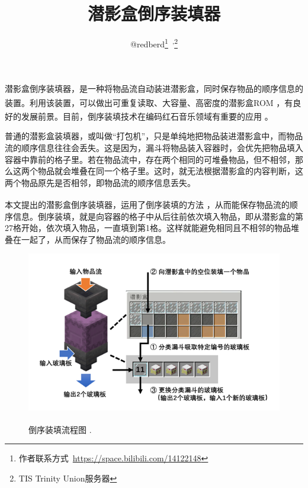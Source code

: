 \documentclass[UTF8,12pt,punct=kaiming,fontset=none]{ctexart}
\title{\vspace{-1.5cm}潜影盒倒序装填器\vspace{-0.5cm}}
\author{@redberd\thanks{作者联系方式~\url{https://space.bilibili.com/14122148}}~\textsuperscript{,}\thanks{TIS Trinity Union服务器}}
\date{}
\newcommand*{\upcite}[1]{
    \textsuperscript{\cite{#1}}
}
\begin{document}
\maketitle
\thispagestyle{fancy} %
\vspace{-0.7cm}

\titleformat{\section}[hang]{\large\sffamily\bfseries}{\textmd{\thesection}}{0.5cm}{}
\titlespacing{\section}{0cm}{0.5ex}{0.2ex}
\titleformat{\subsection}[hang]{\normalsize\sffamily}{\textmd{\thesubsection}}{0.5cm}{}
\titlespacing{\subsection}{0cm}{0.5ex}{0.2ex}
\setcounter{section}{0}

潜影盒倒序装填器，是一种将物品流自动装进潜影盒，同时保存物品的顺序信息的装置。利用该装置，可以做出可重复读取、大容量、高密度的潜影盒ROM\upcite{ref1}，有良好的发展前景。目前，倒序装填技术在编码红石音乐领域有重要的应用\upcite{ref2}。

普通的潜影盒装填器，或叫做“打包机”，只是单纯地把物品装进潜影盒中，而物品流的顺序信息往往会丢失。这是因为，漏斗将物品装入容器时，会优先把物品填入容器中靠前的格子里。若在物品流中，存在两个相同的可堆叠物品，但不相邻，那么这两个物品就会堆叠在同一个格子里。这时，就无法根据潜影盒的内容判断，这两个物品原先是否相邻，即物品流的顺序信息丢失。

本文提出的潜影盒倒序装填器，运用了倒序装填的方法\upcite{ref3}，从而能保存物品流的顺序信息。倒序装填，就是向容器的格子中从后往前依次填入物品，即从潜影盒的第27格开始，依次填入物品，一直填到第1格。这样就能避免相同且不相邻的物品堆叠在一起了，从而保存了物品流的顺序信息。

\begin{figure}[h]
    \centering
    \includegraphics[width=.9\textwidth]{图片1.png}
    \label{fig:1}
    \caption{倒序装填流程图\upcite{ref1}.}
\end{figure}
\end{document}
